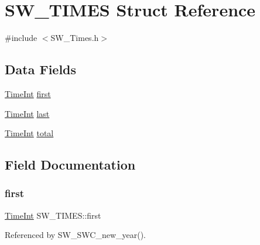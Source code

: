 \hypertarget{struct_s_w___t_i_m_e_s}{}\section{S\+W\+\_\+\+T\+I\+M\+ES Struct Reference}
\label{struct_s_w___t_i_m_e_s}


{\ttfamily \#include $<$S\+W\+\_\+\+Times.\+h$>$}

\subsection*{Data Fields}
\begin{DoxyCompactItemize}
\item 
\hyperlink{_times_8h_a25ac787161a5cad0e3fdfe5a5aeb3236}{Time\+Int} \hyperlink{struct_s_w___t_i_m_e_s_a2372efdb38727b02e23b656558133005}{first}
\item 
\hyperlink{_times_8h_a25ac787161a5cad0e3fdfe5a5aeb3236}{Time\+Int} \hyperlink{struct_s_w___t_i_m_e_s_a0de7d85c5eee4a0775985feb738ed990}{last}
\item 
\hyperlink{_times_8h_a25ac787161a5cad0e3fdfe5a5aeb3236}{Time\+Int} \hyperlink{struct_s_w___t_i_m_e_s_a946437b33df6064e8a2ceaff8d87403e}{total}
\end{DoxyCompactItemize}


\subsection{Field Documentation}
\mbox{\label{struct_s_w___t_i_m_e_s_a2372efdb38727b02e23b656558133005}} 
\subsubsection{\texorpdfstring{first}{first}}
{\footnotesize\ttfamily \hyperlink{_times_8h_a25ac787161a5cad0e3fdfe5a5aeb3236}{Time\+Int} S\+W\+\_\+\+T\+I\+M\+E\+S\+::first}



Referenced by S\+W\+\_\+\+S\+W\+C\+\_\+new\+\_\+year().

\mbox{\label{struct_s_w___t_i_m_e_s_a0de7d85c5eee4a0775985feb738ed990}} 
